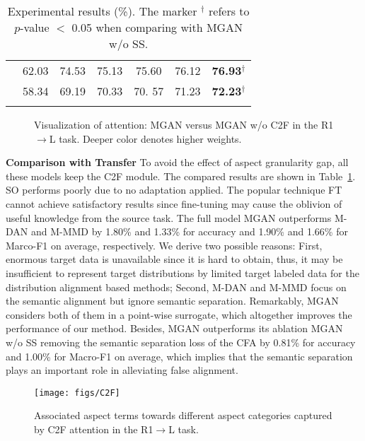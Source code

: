 \documentclass[letterpaper]{article} \usepackage{aaai19}  \usepackage{times}  \usepackage{latexsym}
\begin{document}
\begin{table}[tb]
{\begin{tabular}{c|cccccc}
\Xhline{2.5\arrayrulewidth}
\multirow{2}{*}{Average}   
&62.03	& 74.53	& 75.13	& 75.60	& 76.12 	     & \textbf{76.93}$^{\dag}$					 \\ 
&58.34	& 69.19	& 70.33	& 70.	57	& 71.23         & \textbf{72.23}$^{\dag}$					\\
\Xhline{2.5\arrayrulewidth}
\end{tabular}}
\vspace{-2mm}
\caption{Experimental results (\%). The marker $^{\dag}$ refers to $p$-value $<$ 0.05 when comparing with MGAN w/o SS.}
\label{table:mr2}
\vspace{-6mm}
\end{table}


\begin{figure*}[tb!]
\centering
{}
\vspace{-4mm}
\caption{Visualization of attention: MGAN versus MGAN w/o C2F in the R1$\rightarrow$L task. Deeper color denotes higher weights.}
\vspace{-6mm}
\label{attention}
\end{figure*}


\vspace{1mm}
\noindent \textbf{Comparison with Transfer} To avoid the effect of aspect granularity gap, all these models keep the C2F module. The compared results are shown in Table~\ref{table:mr2}. SO performs poorly due to no adaptation applied. The popular technique FT cannot achieve satisfactory results since fine-tuning may cause the oblivion of useful knowledge from the source task. The full model MGAN outperforms M-DAN and M-MMD by 1.80\% and 1.33\% for accuracy and 1.90\% and 1.66\% for Marco-F1 on average, respectively. We derive two possible reasons: First, enormous target data is unavailable since it is hard to obtain, thus, it may be insufficient to represent target distributions by limited target labeled data for the distribution alignment based methods; Second, M-DAN and M-MMD focus on the semantic alignment but ignore semantic separation. Remarkably, MGAN considers both of them in a point-wise surrogate, which altogether improves the performance of our method. Besides, MGAN outperforms its ablation MGAN w/o SS removing the semantic separation loss of the CFA by 0.81\% for accuracy and 1.00\% for Macro-F1 on average, which implies that the semantic separation plays an important role in alleviating false alignment.

\begin{figure}[tb!]
\centering
\texttt{[image: figs/C2F]}
\vspace{-2mm}
\caption{Associated aspect terms towards different aspect categories captured by C2F attention in the R1$\rightarrow$L task.}
\vspace{-5mm}
\label{fig:words}
\end{figure}
\end{document}
